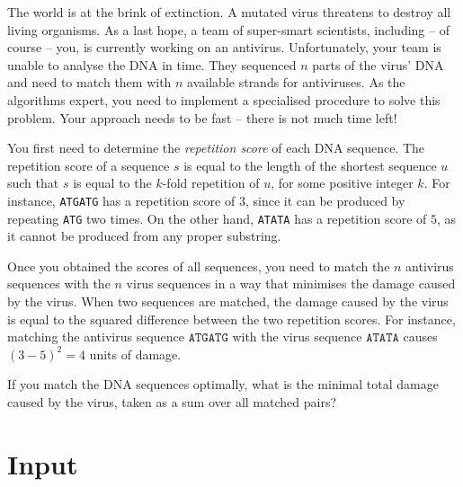 
The world is at the brink of extinction.
A mutated virus threatens to destroy all living organisms.
As a last hope, a team of super-smart scientists, including -- of course -- you, is currently working on an antivirus.
Unfortunately, your team is unable to analyse the DNA in time.
They sequenced $n$ parts of the virus' DNA and need to match them with $n$ available strands for antiviruses.
As the algorithms expert, you need to implement a specialised procedure to solve this problem.
Your approach needs to be fast -- there is not much time left!

You first need to determine the \emph{repetition score} of each DNA sequence.
The repetition score of a sequence $s$ is equal to the length of the shortest sequence $u$ such that $s$ is equal to the $k$-fold repetition of $u$, for some positive integer $k$.
For instance, \texttt{ATGATG} has a repetition score of $3$, since it can be produced by repeating \texttt{ATG} two times.
On the other hand, \texttt{ATATA} has a repetition score of $5$, as it cannot be produced from any proper substring.

Once you obtained the scores of all sequences, you need to match the $n$ antivirus sequences with the $n$ virus sequences in a way that minimises the damage caused by the virus.
When two sequences are matched, the damage caused by the virus is equal to the squared difference between the two repetition scores.
For instance, matching the antivirus sequence $\texttt{ATGATG}$ with the virus sequence $\texttt{ATATA}$ causes $(3-5)^2 = 4$ units of damage.

If you match the DNA sequences optimally, what is the minimal total damage caused by the virus, taken as a sum over all matched pairs?

\vspace{-5mm}
\section*{Input}
\vspace{-2mm}

